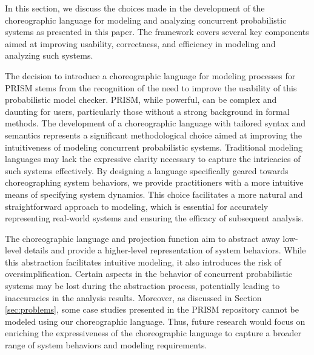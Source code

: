 In this section, we discuss the choices made in the development of the choreographic language for modeling and analyzing concurrent probabilistic systems as presented in this paper. The framework covers  several key components aimed at improving usability, correctness, and efficiency in modeling and analyzing such systems.

The decision to introduce a choreographic language for modeling processes for PRISM stems from the recognition of the need to improve the usability of this probabilistic model checker. PRISM, while powerful, can be complex and daunting for users, particularly those without a strong background in formal methods. 
The development of a choreographic language with tailored syntax and semantics represents a significant methodological choice aimed at improving the intuitiveness of modeling concurrent probabilistic systems. Traditional modeling languages may lack the expressive clarity necessary to capture the intricacies of such systems effectively. By designing a language specifically geared towards choreographing system behaviors, we provide practitioners with a more intuitive means of specifying system dynamics. This choice facilitates a more natural and straightforward approach to modeling, which is essential for accurately representing real-world systems and ensuring the efficacy of subsequent analysis.

The choreographic language and projection function aim to abstract away low-level details and provide a higher-level representation of system behaviors. While this abstraction facilitates intuitive modeling, it also introduces the risk of oversimplification. Certain aspects in the behavior of concurrent probabilistic systems may be lost during the abstraction process, potentially leading to inaccuracies in the analysis results. Moreover, as discussed in Section \ref{sec:problems}, some case studies presented in the PRISM repository cannot be modeled using our choreographic language. Thus, future research would focus on enriching the expressiveness of the choreographic language to capture a broader range of system behaviors and modeling requirements.